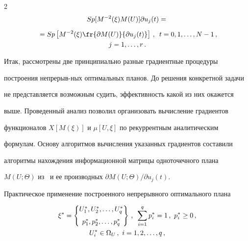\begin{multicols}{2}
\begin{multline*}
{  Sp[M^{-2}(\xi)M(U)]}{\partial u_j(t)}={}\\[6pt]


  {}=Sp\left[ M^{-2}(\xi)\fr{\partial


M(U)}{\partial u_j(t)}\right]\,, \enskip t=0,1, \ldots ,N-1\,, \\ j=1, \ldots ,r\,.


    \end{multline*}





   Итак, рассмотрены две принципиально разные градиентные процедуры


построения непрерыв-\linebreak ных оптимальных планов. До решения конкретной задачи


не представляется возможным судить, эффективность какой из них окажется


выше. Проведенный анализ позволил организовать вычисление градиентов


функционалов $X[M(\xi)]$ и $\mu[U,\xi]$ по рекуррентным аналитическим


формулам. Основу алгоритмов вычисления указанных градиентов составили


алгоритмы нахождения информационной матрицы одноточечного плана


$M(U;\Theta)$ из~\cite{19-c} и ее производных $\partial M(U;\Theta)/\partial


u_j(t)$.





  Практическое применение построенного непрерывного оптимального плана


\begin{multline*}


  \xi^*=\left\{


  \begin{matrix}


  U_1^*, U_2^*, \ldots , U_q^*\\[6pt]


  p_1^*, p_2^*, \ldots , p_q^*


  \end{matrix}


  \right \}\,,\enskip \sum\limits_{i=1}^q p_i^*=1\,,\ p_i^*\geq 0\,,\\ U_i^*\in


\Omega_U\,,\ i=1, 2, \ldots , q\,,


  \end{multline*}



\end{multicols}

